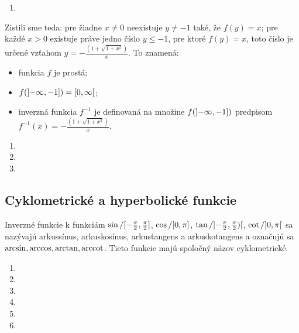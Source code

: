 \begin{enumerate}[resume]
  \showanswers
    \item {}
  \hideanswers
\end{enumerate}

Zistili sme teda: pre žiadne $x\neq 0$ neexistuje $y\neq -1$ také, že $f(y)=x$;
pre každé $x>0$ existuje práve jedno číslo $y\leq -1$, pre ktoré $f(y)=x$, toto
číslo je určené vzťahom $y=-\frac{(1+\sqrt{1+x^2})}{x}$. To znamená:
\begin{itemize}
\item funkcia $f$ je prostá;
\item $f(\interval[open left]{-\infty}{-1})=\interval[open right]{0}{\infty}$;
\item
  inverzná funkcia $f^{-1}$ je definovaná na množine
  $f(\interval[open left]{-\infty}{-1})$ predpisom
  $f^{-1}(x)=-\frac{(1+\sqrt{1+x^2})}{x}$.
\end{itemize}

\begin{enumerate}[resume]
  \item {}
  \item {}
  \item {}
\end{enumerate}

\subsection{Cyklometrické a hyperbolické funkcie}

Inverzné funkcie k funkciám
$\sin / \interval{-\frac{\pi}{2}}{\frac{\pi}{2}}$,
$\cos / \interval{0}{\pi}$,
$\tan / \interval[open]{-\frac{\pi}{2}}{\frac{\pi}{2})}$,
$\cot / \interval[open]{0}{\pi}$
sa nazývajú arkussínus, arkuskosínus, arkustangens a arkuskotangens a označujú
sa $\arcsin, \arccos, \arctan, \operatorname{arccot}$. Tieto funkcie majú spoločný názov
cyklometrické.

\begin{enumerate}[resume]

  \item {}
  \item {}
  \item {}
  \showanswers
  \item {}
  \item {}
  \hideanswers
  \item {}
\end{enumerate}

